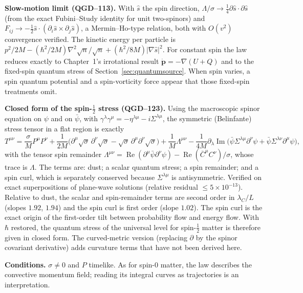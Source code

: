 \documentclass[11pt,a4paper]{article}
\begin{document}
\noindent\textbf{Slow-motion limit (QGD--113).} With $\hat s$ the spin direction,
$\Lambda/\sigma\to\frac14\partial\hat s\cdot\partial\hat s$ (from the exact Fubini--Study identity
for unit two-spinors) and $F_{ij}\to-\frac12\hat s\cdot(\partial_i\hat s\times\partial_j\hat s)$, a
Mermin--Ho-type relation, both with $O(v^2)$ convergence verified. The kinetic
energy per particle is
$p^2/2M-(\hbar^2/2M)\nabla^2\sqrt n/\sqrt n+(\hbar^2/8M)|\nabla\hat s|^2$. For constant spin
the law reduces exactly to Chapter~1's irrotational result
$\dot{\bm p}=-\nabla(U+Q)$ and to the fixed-spin quantum stress of
Section~\ref{sec:quantumsource}. When spin varies, a spin quantum potential and a
spin-vorticity force appear that those fixed-spin treatments omit.

\noindent\textbf{Closed form of the spin-$\frac12$ stress (QGD--123).} Using the macroscopic spinor
equation on $\psi$ and on $\bar\psi$, with $\gamma^\lambda\gamma^\mu=-\eta^{\lambda\mu}-i\Sigma^{\lambda\mu}$, the symmetric
(Belinfante) stress tensor in a flat region is exactly
\begin{equation}\label{eq:Tclosed}
T^{\mu\nu}=\frac{\sigma}{M}P^\mu P^\nu
+\frac1{2M}\bigl(\partial^\mu\!\sqrt\sigma\,\partial^\nu\!\sqrt\sigma-\sqrt\sigma\,\partial^\mu\partial^\nu\!\sqrt\sigma\bigr)
+\frac1M\Lambda^{\mu\nu}
-\frac1{4M}\partial_\lambda\operatorname{Im}\bigl(\bar\psi\Sigma^{\lambda\mu}\partial^\nu\psi+\bar\psi\Sigma^{\lambda\nu}\partial^\mu\psi\bigr),
\end{equation}
with the tensor spin remainder
$\Lambda^{\mu\nu}=\operatorname{Re}(\partial^\mu\bar\psi\partial^\nu\psi)-\operatorname{Re}(\bar C^\mu C^\nu)/\sigma$, whose trace is $\Lambda$. The terms
are: dust; a scalar quantum stress; a spin remainder; and a spin curl, which is separately
conserved because $\Sigma^{\lambda\mu}$ is antisymmetric. Verified on exact superpositions of
plane-wave solutions (relative residual $\le5\times10^{-13}$). Relative to dust, the scalar and
spin-remainder terms are second order in $\lambda_C/L$ (slopes $1.92$, $1.94$) and the spin curl is
first order (slope $1.02$). The spin curl is the exact origin of the first-order tilt between
probability flow and energy flow. With $\hbar$ restored, the quantum stress of the universal
level for spin-$\frac12$ matter is therefore given in closed form. The curved-metric version
(replacing $\partial$ by the spinor covariant derivative) adds curvature terms that have not been
derived here.

\noindent\textbf{Conditions.} $\sigma\neq0$ and $P$ timelike. As for spin-0 matter, the
law describes the convective momentum field; reading its integral curves as
trajectories is an interpretation.
\end{document}
